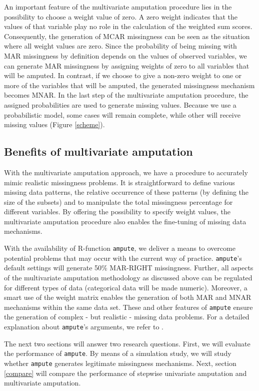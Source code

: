 \documentclass[]{interact}
\newcommand{\code}[1]{\texttt{#1}}
\begin{document}
An important feature of the multivariate amputation procedure lies in the possibility to choose a weight value of zero. A zero weight indicates that the values of that variable play no role in the calculation of the weighted sum scores. Consequently, the generation of MCAR missingness can be seen as the situation where all weight values are zero. Since the probability of being missing with MAR missingness by definition depends on the values of observed variables, we can generate MAR missingness by assigning weights of zero to all variables that will be amputed. In contrast, if we choose to give a non-zero weight to one or more of the variables that will be amputed, the generated missingness mechanism becomes MNAR. In the last step of the multivariate amputation procedure, the assigned probabilities are used to generate missing values. Because we use a probabilistic model, some cases will remain complete, while other will receive missing values (Figure \ref{scheme}).

\subsection{\normalsize Benefits of multivariate amputation}\label{solution}

With the multivariate amputation approach, we have a procedure to accurately mimic realistic missingness problems. It is straightforward to define various missing data patterns, the relative occurrence of these patterns (by defining the size of the subsets) and to manipulate the total missingness percentage for different variables. By offering the possibility to specify weight values, the multivariate amputation procedure also enables the fine-tuning of missing data mechanisms. 

With the availability of R-function \code{ampute}, we deliver a means to overcome potential problems that may occur with the current way of practice. \code{ampute}'s default settings will generate 50\% MAR-RIGHT missingness. Further, all aspects of the multivariate amputation methodology as discussed above can be regulated for different types of data (categorical data will be made numeric). Moreover, a smart use of the weight matrix enables the generation of both MAR and MNAR mechanisms within the same data set. These and other features of \code{ampute} ensure the generation of complex - but realistic - missing data problems. For a detailed explanation about \code{ampute}'s arguments, we refer to \citep{AmputeVignette}.

The next two sections will answer two research questions. First, we will evaluate the performance of \code{ampute}. By means of a simulation study, we will study whether \code{ampute} generates legitimate missingness mechanisms. Next, section \ref{compare} will compare the performance of stepwise univariate amputation and multivariate amputation. 
\end{document}
